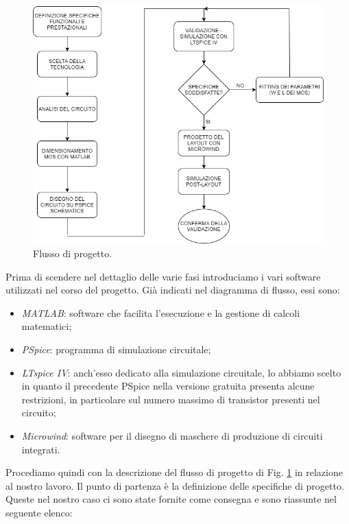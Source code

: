 \begin{figure}[hbt!]
	\centering
	\includegraphics[width=1\textwidth]{figure/WorkflowDiagram.png}
	\caption{Flusso di progetto.}
	\label{fig:workflow}
\end{figure}

Prima di scendere nel dettaglio delle varie fasi introduciamo i vari software utilizzati nel corso del progetto. Già indicati nel diagramma di flusso, essi sono:

\begin{itemize}
	\item \textit{MATLAB}: software che facilita l'esecuzione e la gestione di calcoli matematici;
	\item \textit{PSpice}: programma di simulazione circuitale;
	\item \textit{LTspice IV}: anch'esso dedicato alla simulazione circuitale, lo abbiamo scelto in quanto il precedente PSpice nella versione gratuita presenta alcune restrizioni, in particolare sul numero massimo di transistor presenti nel circuito;
	\item \textit{Microwind}: software per il disegno di maschere di produzione di circuiti integrati.
\end{itemize}

Procediamo quindi con la descrizione del flusso di progetto di Fig. \ref{fig:workflow} in relazione al nostro lavoro. Il punto di partenza è la definizione delle specifiche di progetto. Queste nel nostro caso ci sono state fornite come consegna e sono riassunte nel seguente elenco:

